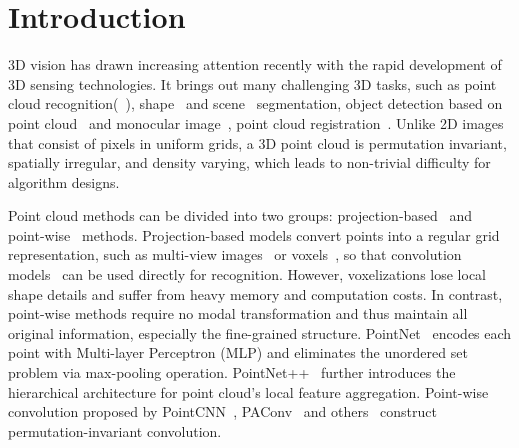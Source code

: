 \documentclass[sigconf]{acmart}
\begin{document}





\maketitle


\section{Introduction}
\label{sec:intro}

3D vision has drawn increasing attention recently with the rapid development of 3D sensing technologies. It brings out many challenging 3D tasks, such as point cloud recognition(~\cite{xie2018attentional,rao2019spherical,mahmoudi2009three}), shape~\cite{yi2017syncspeccnn} and scene~\cite{rusu2009close,zhang2020point,yang2015new} segmentation, object detection based on point cloud~\cite{zhou2018voxelnet,shi2020point,wang2015voting,shi2020points,he2020structure} and monocular image~\cite{weng2019monocular,peng2021lidar,xu2018multi}, point cloud registration~\cite{aoki2019pointnetlk,yang2020teaser,wang2019deep}.   Unlike 2D images that consist of pixels in uniform grids, a 3D point cloud is permutation invariant, spatially irregular, and density varying, which leads to non-trivial difficulty for algorithm designs. 

Point cloud methods can be divided into two groups: projection-based~\cite{goyal2021revisiting,roveri2018network,sarkar2018learning,qi2016volumetric,wu20153d,maturana2015voxnet} and point-wise~\cite{qi2017pointnet,qi2017pointnet++,li2018pointcnn,liu2019relation,wu2019pointconv} methods. 
Projection-based models convert points into a regular grid representation, such as multi-view images~\cite{goyal2021revisiting,roveri2018network,sarkar2018learning} or voxels~\cite{qi2016volumetric,wu20153d,maturana2015voxnet}, so that convolution models~\cite{maturana2015voxnet} can be used directly for recognition. However, voxelizations lose local shape details and suffer from heavy memory and computation costs. In contrast, point-wise methods require no modal transformation and thus maintain all original information, especially the fine-grained structure. 
PointNet~\cite{qi2017pointnet} encodes each point with Multi-layer Perceptron (MLP) and eliminates the unordered set problem via max-pooling operation. PointNet++~\cite{qi2017pointnet++} further introduces the hierarchical architecture for point cloud's local feature aggregation. Point-wise convolution proposed by PointCNN~\cite{li2018pointcnn}, PAConv~\cite{xu2021paconv} and others~\cite{howard2017mobilenets} construct permutation-invariant convolution.
\end{document}
